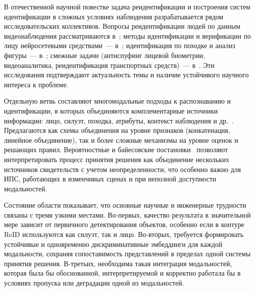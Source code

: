 В отечественной научной повестке задача реидентификации и построения систем
идентификации в сложных условиях наблюдения разрабатывается рядом
исследовательских коллективов. Вопросы реидентификации людей по данным
видеонаблюдения рассматриваются
в~\cite{Ignatyeva2022polotsk,Ignatyeva2023augment,Ignatyeva2024reid,Bagirov2022reid,Bagirov2025tracking,IdrissiAlami2025reid};
методы идентификации и верификации по лицу нейросетевыми средствами~---
в~\cite{Vizilter2017face,Savchenko2017dnn,Chastikova2019face,Oreshin2017auth,Nebaba2017face3d,Oleinik2018face};
идентификация по походке и анализ фигуры~---
в~\cite{Sokolova2019gait,Uzdyaev2020gait,Leonov2023gait,Sergeev2021bodyparts};
смежные задачи (антиспуфинг лицевой биометрии, видеоаналитика, реидентификация
транспортных средств)~--- в~\cite{Volkova2017antispoof,Denisova2022antispoof,Dvoinikova2021audiovisual,Gupta2024review,Nemtsev2019vehicle,Mudrich2024face}.
Эти исследования подтверждают
актуальность темы и наличие устойчивого научного интереса к проблеме.

Отдельную ветвь составляют многомодальные подходы к распознаванию и идентификации,
в которых объединяются комплементарные источники информации: лицо, силуэт,
походка, атрибуты, контекст наблюдения и др.~\cite{Irfan2022multimodal,Koo2018multimodal,Liao2023mmmgcn,Shoukry2022multimodal,Zhao2017spindle}. Предлагаются
как схемы объединения на уровне признаков (конкатенация, линейное объединение),
так и более сложные механизмы на уровне оценок и решающих правил. Вероятностные
и байесовские постановки~\cite{Chen2012bayesface,Liong2014bayesreid,Liu2018bayesreid,Moghaddam2000bayesface,Krivenko2020bayes,Saburov2024bayes} позволяют интерпретировать процесс
принятия решения как объединение нескольких источников свидетельств с учетом
неопределенности, что особенно важно для ИПС, работающих в изменчивых сценах
и при неполной доступности модальностей.

Состояние области показывает, что основные научные и инженерные трудности
связаны с тремя узкими местами. Во‑первых, качество результата в значительной мере
зависит от первичного детектирования объектов, особенно если в контуре ReID
используются как силуэт, так и лицо. Во‑вторых, требуется формировать
устойчивые и одновременно дискриминативные эмбеддинги для каждой модальности,
сохраняя сопоставимость представлений в пределах одной системы принятия решения.
В‑третьих, необходима такая интеграция модальностей, которая была бы
обоснованной, интерпретируемой и корректно работала бы в условиях пропуска
или деградации одной из модальностей.

